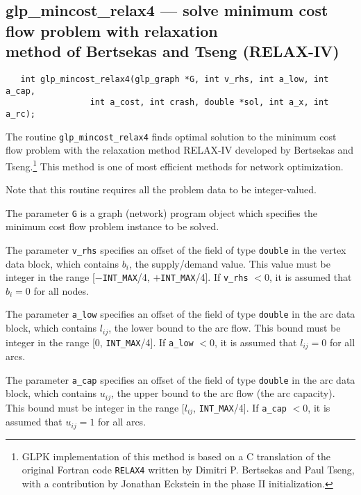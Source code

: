 \documentclass[11pt]{report}
\def\para#1{\noindent{\bf#1}}
\def\synopsis{\para{Synopsis}}
\def\description{\para{Description}}
\begin{document}
\subsection{glp\_mincost\_relax4 --- solve minimum cost flow problem
with relaxation\\method of Bertsekas and Tseng (RELAX-IV)}

\synopsis

\begin{verbatim}
   int glp_mincost_relax4(glp_graph *G, int v_rhs, int a_low, int a_cap,
                 int a_cost, int crash, double *sol, int a_x, int a_rc);
\end{verbatim}

\description

The routine \verb|glp_mincost_relax4| finds optimal solution to the
minimum cost flow problem with the relaxation method RELAX-IV developed
by Bertsekas and Tseng.\footnote{GLPK implementation of this method is
based on a C translation of the original Fortran code {\tt RELAX4}
written by Dimitri P. Bertsekas and Paul Tseng, with a contribution by
Jonathan Eckstein in the phase II initialization.} This method is one
of most efficient methods for network optimization.

Note that this routine requires all the problem data to be
integer-valued.

The parameter \verb|G| is a graph (network) program object which
specifies the minimum cost flow problem instance to be solved.

The parameter \verb|v_rhs| specifies an offset of the field of type
\verb|double| in the vertex data block, which contains $b_i$, the
supply/demand value. This value must be integer in the range
[$-$\verb|INT_MAX|/4, $+$\verb|INT_MAX|/4]. If \verb|v_rhs| $<0$, it is
assumed that $b_i=0$ for all nodes.

The parameter \verb|a_low| specifies an offset of the field of type
\verb|double| in the arc data block, which contains $l_{ij}$, the lower
bound to the arc flow. This bound must be integer in the range
{\linebreak} [$0$, \verb|INT_MAX|/4]. If \verb|a_low| $<0$, it is
assumed that $l_{ij}=0$ for all arcs.

The parameter \verb|a_cap| specifies an offset of the field of type
\verb|double| in the arc data block, which contains $u_{ij}$, the upper
bound to the arc flow (the arc capacity). This bound must be integer in
the range [$l_{ij}$, \verb|INT_MAX|/4]. If \verb|a_cap| $<0$, it is
assumed that $u_{ij}=1$ for all arcs.
\end{document}
